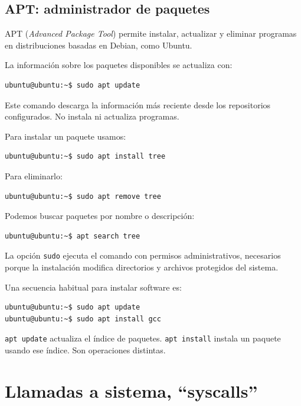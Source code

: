 \documentclass[11pt,a4paper]{article}
\begin{document}
\subsection{APT: administrador de paquetes}

APT (\textit{Advanced Package Tool}) permite instalar, actualizar y eliminar programas en distribuciones basadas en Debian, como Ubuntu.

La información sobre los paquetes disponibles se actualiza con:

\begin{lstlisting}[language=bash]
ubuntu@ubuntu:~$ sudo apt update
\end{lstlisting}

Este comando descarga la información más reciente desde los repositorios configurados. No instala ni actualiza programas.

Para instalar un paquete usamos:

\begin{lstlisting}[language=bash]
ubuntu@ubuntu:~$ sudo apt install tree
\end{lstlisting}

Para eliminarlo:

\begin{lstlisting}[language=bash]
ubuntu@ubuntu:~$ sudo apt remove tree
\end{lstlisting}

Podemos buscar paquetes por nombre o descripción:

\begin{lstlisting}[language=bash]
ubuntu@ubuntu:~$ apt search tree
\end{lstlisting}

La opción \lstinline!sudo! ejecuta el comando con permisos administrativos, necesarios porque la instalación modifica directorios y archivos protegidos del sistema.

Una secuencia habitual para instalar software es:

\begin{lstlisting}[language=bash]
ubuntu@ubuntu:~$ sudo apt update
ubuntu@ubuntu:~$ sudo apt install gcc
\end{lstlisting}

\begin{infobox}
\texttt{apt update} actualiza el índice de paquetes. \texttt{apt install} instala un paquete usando ese índice. Son operaciones distintas.
\end{infobox}

\section{Llamadas a sistema, ``syscalls''}
\end{document}
